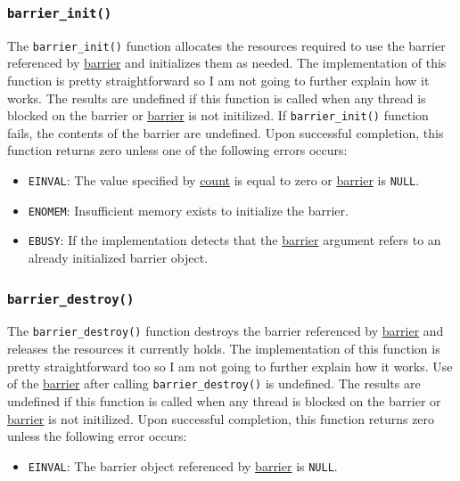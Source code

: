 \documentclass{article}
\def\code#1{\texttt{#1}}
\begin{document}
\subsubsection{\code{barrier\_init()}}
The \code{barrier\_init()} function allocates the resources required to use the barrier
referenced by \underline{barrier} and initializes them as needed. The implementation of
this function is pretty straightforward so I am not going to further explain how it works.
The results are undefined if this function is called when any thread is blocked on the
barrier or \underline{barrier} is not initilized. If \code{barrier\_init()} function fails,
the contents of the barrier are undefined. Upon successful completion, this function returns
zero unless one of the following errors occurs:
\begin{itemize}
 \item \code{EINVAL}: The value specified by \underline{count} is equal to zero or
       \underline{barrier} is \code{NULL}.
 \item \code{ENOMEM}: Insufficient memory exists to initialize the barrier.
 \item \code{EBUSY}: If the implementation detects that the \underline{barrier} argument
       refers to an already initialized barrier object.
\end{itemize}

\subsubsection{\code{barrier\_destroy()}}
The \code{barrier\_destroy()} function destroys the barrier referenced by \underline{barrier}
and releases the resources it currently holds. The implementation of this function is pretty
straightforward too so I am not going to further explain how it works. Use of the \underline{barrier}
after calling \code{barrier\_destroy()} is undefined. The results are undefined if this function is
called when any thread is blocked on the barrier or \underline{barrier} is not initilized.
Upon successful completion, this function returns zero unless the following error occurs:
\begin{itemize}
 \item \code{EINVAL}: The barrier object referenced by \underline{barrier} is \code{NULL}.
\end{itemize}
\end{document}
